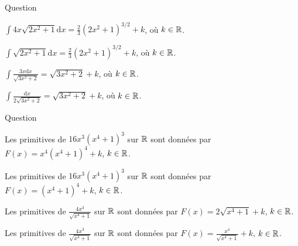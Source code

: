\begin{multi}[multiple,feedback=
{Avec \(u=2x^2+1\), on a : \(\mathrm{d}u=4x\mathrm{d}x\) et
\[\int 4x\sqrt{2x^2+1}\mathrm{d}x=\int \sqrt{u}\mathrm{d}u=\frac{2}{3}u^{3/2}+k=\frac{2}{3}(2x^2+1)^{3/2}+k,\; k\in \Rr.\]
De m\^eme, avec \(u=3x^2+2\), on a : \(\mathrm{d}u=6x\mathrm{d}x\) et
\[\int \frac{3x\mathrm{d}x}{\sqrt{3x^2+2}}=\int \frac{\mathrm{d}u}{2\sqrt{u}}=\sqrt{u}+k=\sqrt{3x^2+2}+k,\; k\in \Rr.\]
}]{Question}
    \item* \(\displaystyle \int 4x\sqrt{2x^2+1}\mathrm{d}x=\frac{2}{3}(2x^2+1)^{3/2}+k\), où \(k\in \mathbb{R}\).
    \item \(\displaystyle \int \sqrt{2x^2+1}\mathrm{d}x=\frac{2}{3}(2x^2+1)^{3/2}+k\), où \(k\in \mathbb{R}\).
    \item* \(\displaystyle \int \frac{3x\mathrm{d}x}{\sqrt{3x^2+2}}=\sqrt{3x^2+2}+k\), où \(k\in \mathbb{R}\).
    \item \(\displaystyle \int \frac{\mathrm{d}x}{2\sqrt{3x^2+2}}=\sqrt{3x^2+2}+k\), où \(k\in \mathbb{R}\).
\end{multi}


\begin{multi}[multiple,feedback=
{Avec \(u=x^4+1\), on a : \(\mathrm{d}u=4x^3\, \mathrm{d}x\). D'où
\[\int 16x^3(x^4+1)^3\mathrm{d}x=\int 4u^3\, \mathrm{d}u=u^4+k=(x^4+1)^4+k,\; k\in \Rr,\]
et
\[\int \frac{4x^3\, \mathrm{d}x}{\sqrt{x^4+1}}=\int \frac{\mathrm{d}u}{\sqrt{u}}=2\sqrt{u}+k=2\sqrt{x^4+1}+k,\; k\in \Rr.\]
}]{Question}
    \item Les primitives de \(16x^3(x^4+1)^3\) sur \(\mathbb{R}\) sont données par \(\displaystyle F(x)=x^4(x^4+1)^4+k\), \(k\in \mathbb{R}\).
    \item* Les primitives de \(16x^3(x^4+1)^3\) sur \(\mathbb{R}\) sont données par \(\displaystyle F(x)=(x^4+1)^4+k\), \(k\in \mathbb{R}\).
    \item* Les primitives de \(\displaystyle \frac{4x^3}{\sqrt{x^4+1}}\) sur \(\mathbb{R}\) sont données par \(\displaystyle F(x)=2\sqrt{x^4+1}+k\), \(k\in \mathbb{R}\).
    \item Les primitives de \(\displaystyle \frac{4x^3}{\sqrt{x^4+1}}\) sur \(\mathbb{R}\) sont données par \(\displaystyle F(x)=\frac{x^4}{\sqrt{x^4+1}}+k\), \(k\in \mathbb{R}\).
\end{multi}


